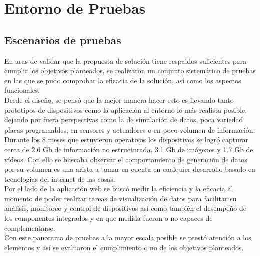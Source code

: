 

\chapter{ Entorno de Pruebas}
\section{Escenarios de pruebas}
En aras de validar que la propuesta de solución tiene respaldos suficientes para cumplir los objetivos planteados, se realizaron un conjunto sistemático de pruebas en las que se pudo comprobar la eficacia de la solución, así como los aspectos funcionales.\\

Desde el diseño, se pensó que la mejor manera hacer esto es llevando tanto prototipos de dispositivos como la aplicación al entorno lo más realista posible, dejando por fuera perspectivas como la de simulación de datos, poca variedad placas programables, en sensores y actuadores o en poco volumen de información.\\

Durante los 8 meses que estuvieron operativos los dispositivos se logró capturar cerca de 2.6 Gb de información no estructurada, 3.1 Gb de imágenes y 1.7 Gb de vídeos. Con ello se buscaba observar el comportamiento de generación de datos por su volumen es una arista a tomar en cuenta en cualquier desarrollo basado en tecnologías del internet de las cosas.\\

Por el lado de la aplicación web se buscó medir la eficiencia y la eficacia al momento de poder realizar tareas de visualización de datos para facilitar su análisis, monitoreo y control de dispositivos así como también el desempeño de los componentes integrados y en que medida fueron o no capaces de complementarse.\\

Con este panorama de pruebas a la mayor escala posible se prestó atención a los elementos y así se evaluaron el cumplimiento o no de los objetivos planteados. 


